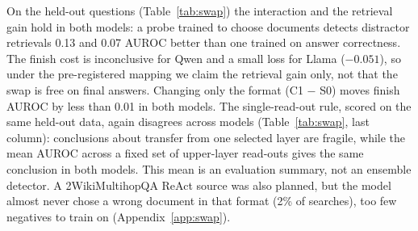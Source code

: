 \documentclass[11pt]{article}
\begin{document}
On the held-out questions (Table~\ref{tab:swap}) the interaction and the retrieval gain hold in both models: a
probe trained to choose documents detects distractor retrievals 0.13 and 0.07 AUROC better than one trained on
answer correctness. The finish cost is inconclusive for Qwen and a small loss for Llama ($-0.051$), so under the
pre-registered mapping we claim the retrieval gain only, not that the swap is free on final answers. Changing only
the format (C1 $-$ S0) moves finish AUROC by less than 0.01 in both models. The single-read-out rule, scored on the
same held-out data, again disagrees across models (Table~\ref{tab:swap}, last column): conclusions about transfer from
one selected layer are fragile, while the mean AUROC across a fixed set of upper-layer read-outs gives the same
conclusion in both models. This mean is an evaluation summary, not an ensemble detector. A 2WikiMultihopQA
ReAct source was also planned, but the model almost never chose a wrong document in that format (2\% of
searches), too few negatives to train on (Appendix~\ref{app:swap}).

\begin{table}[t]
\centering\small
\caption{Trajectory confidence on finished development test episodes (Qwen: 286, 63.6\% correct; Llama: 269, 78.1\%
correct). ECE: ten equal-width bins.}
\label{tab:rq3}
\footnotesize\setlength{\tabcolsep}{2.6pt}
\end{table}
\end{document}
